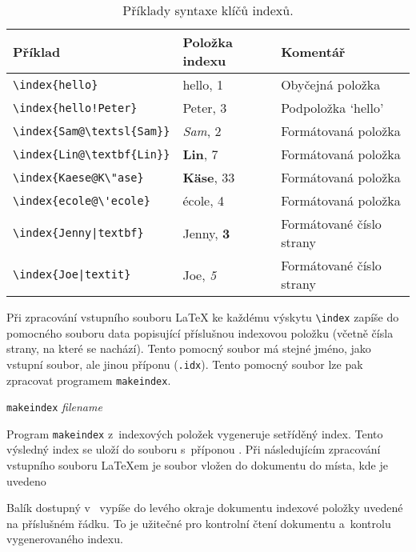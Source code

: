 \begin{table}[!bht]
\caption{Příklady syntaxe klíčů indexů.}
\label{index}
\begin{center}
\begin{tabular}{@{}lll@{}}
  \textbf{Příklad} &\textbf{Položka indexu} &\textbf{Komentář}\\\hline
  \rule{0pt}{1.05em}\verb|\index{hello}| &hello, 1 &Obyčejná položka\\ 
\verb|\index{hello!Peter}|   &\hspace*{2ex}Peter, 3 &Podpoložka `hello'\\ 
\verb|\index{Sam@\textsl{Sam}}|     &\textsl{Sam}, 2& Formátovaná položka\\ 
\verb|\index{Lin@\textbf{Lin}}|     &\textbf{Lin}, 7& Formátovaná položka\\ 
\verb|\index{Kaese@K\"ase}|     &\textbf{K\"ase}, 33& Formátovaná položka\\ 
\verb.\index{ecole@\'ecole}.     &\'ecole, 4& Formátovaná položka\\
\verb.\index{Jenny|textbf}.     &Jenny, \textbf{3}& Formátované číslo strany\\
\verb.\index{Joe|textit}.     &Joe, \textit{5}& Formátované číslo strany
\end{tabular}
\end{center}
\end{table}

Při zpracování vstupního souboru \LaTeX{} ke každému výskytu
\verb|\index| zapíše do pomocného souboru data popisující
příslušnou indexovou položku (včetně čísla strany, na které
se nachází). Tento pomocný soubor má stejné jméno, jako vstupní
soubor, ale jinou příponu (\verb|.idx|). Tento pomocný soubor
lze pak zpracovat programem \texttt{makeindex}.

\begin{lscommand}
  \texttt{makeindex} \emph{filename}
\end{lscommand}
Program \texttt{makeindex} z~indexových položek vygeneruje setříděný index.
Tento výsledný index se uloží do souboru s~příponou .
Při následujícím zpracování vstupního souboru \LaTeX em je soubor 
vložen do dokumentu do místa, kde je uvedeno
\begin{lscommand}
\end{lscommand}

Balík  dostupný v~\LaTeXe{} vypíše do levého okraje dokumentu
indexové položky uvedené na příslušném řádku. To je užitečné pro kontrolní
čtení dokumentu a~kontrolu vygenerovaného indexu.

